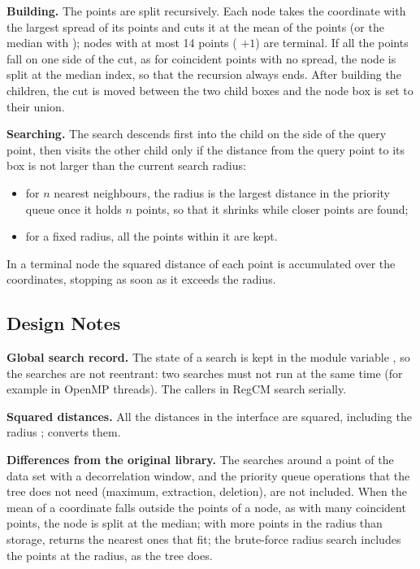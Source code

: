 \textbf{Building.} The points are split recursively. Each node takes the
coordinate with the largest spread of its points and cuts it at the mean of
the points (or the median with ); nodes with at most 14
points ( $+ 1$) are terminal. If all the points fall on
one side of the cut, as for coincident points with no spread, the node is
split at the median index, so that the recursion always ends. After building
the children, the cut is moved between the two child boxes and the node box
is set to their union.

\textbf{Searching.} The search descends first into the child on the side of
the query point, then visits the other child only if the distance from the
query point to its box is not larger than the current search radius:
\begin{itemize}
  \item for $n$ nearest neighbours, the radius is the largest distance in
        the priority queue once it holds $n$ points, so that it shrinks
        while closer points are found;
  \item for a fixed radius, all the points within it are kept.
\end{itemize}
In a terminal node the squared distance of each point is accumulated over
the coordinates, stopping as soon as it exceeds the radius.

\subsection{Design Notes}

\textbf{Global search record.} The state of a search is kept in the module
variable , so the searches are not reentrant: two searches must not
run at the same time (for example in OpenMP threads). The callers in RegCM
search serially.

\textbf{Squared distances.} All the distances in the interface are squared,
including the radius ;  converts them.

\textbf{Differences from the original library.} The searches around a
point of the data set with a decorrelation window, and the priority queue
operations that the tree does not need (maximum, extraction, deletion),
are not included. When the mean of a coordinate falls outside the points of
a node, as with many coincident points, the node is split at the median;
with more points in the radius than storage, 
returns the nearest ones that fit; the brute-force radius search includes
the points at the radius, as the tree does.

